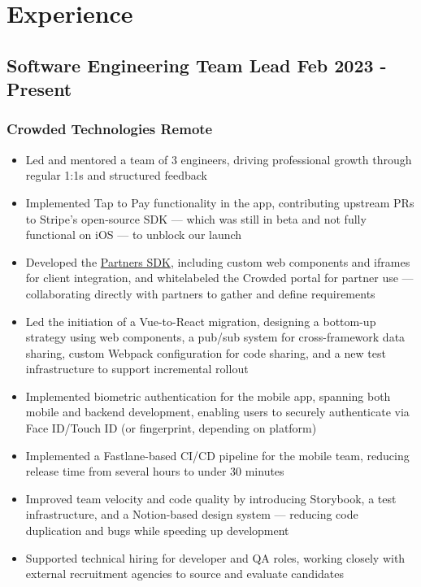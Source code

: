 \documentclass[11pt]{article} %
\begin{document}
\section{Experience}
\subsection{Software Engineering Team Lead \hfill Feb 2023 - Present} %
\subsubsection{Crowded Technologies \hfill Remote}
\begin{itemize}
	\item Led and mentored a team of 3 engineers, driving professional growth through regular 1:1s and structured feedback
	\item Implemented Tap to Pay functionality in the app, contributing upstream PRs to Stripe's open-source SDK — which was still in beta and not fully functional on iOS — to unblock our launch
	\item Developed the \href{https://developer.crowdedfinance.com/}{Partners SDK}, including custom web components and iframes for client integration, and whitelabeled the Crowded portal for partner use — collaborating directly with partners to gather and define requirements
	\item Led the initiation of a Vue-to-React migration, designing a bottom-up strategy using web components, a pub/sub system for cross-framework data sharing, custom Webpack configuration for code sharing, and a new test infrastructure to support incremental rollout
	\item Implemented biometric authentication for the mobile app, spanning both mobile and backend development, enabling users to securely authenticate via Face ID/Touch ID (or fingerprint, depending on platform)
	\item Implemented a Fastlane-based CI/CD pipeline for the mobile team, reducing release time from several hours to under 30 minutes
	\item Improved team velocity and code quality by introducing Storybook, a test infrastructure, and a Notion-based design system — reducing code duplication and bugs while speeding up development
	\item Supported technical hiring for developer and QA roles, working closely with external recruitment agencies to source and evaluate candidates

\end{itemize}
\end{document}
